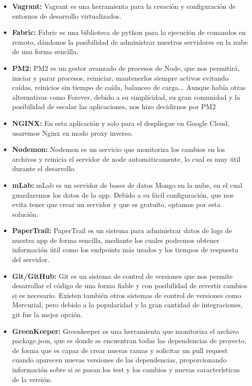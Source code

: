 \begin{itemize}
  \item \textbf{Vagrant:} Vagrant es una herramienta para la creación y configuración de entornos de desarrollo virtualizados.
  
  \item \textbf{Fabric: } Fabric es una biblioteca de python para la ejecución de comandos en remoto, dándonos la posibilidad de administrar nuestros servidores en la nube de una forma sencilla.
  
  \item \textbf{PM2:} PM2 es un gestor avanzado de procesos de Node, que nos permitirá, iniciar y parar procesos, reiniciar, mantenerlos siempre activos evitando caídas, reinicios sin tiempo de caída, balanceo de carga... Aunque había otras alternativas como Forever, debido a su simplicidad, su gran comunidad y la posibilidad de escalar las aplicaciones, nos hizo decidirnos por PM2
  
  \item \textbf{NGINX:} En esta aplicación y solo para el despliegue en Google Cloud, usaremos Nginx en modo \gls{proxy inverso}.
  
  \item \textbf{Nodemon:} Nodemon es un servicio que monitoriza los cambios en los archivos y reinicia el servidor de node automáticamente, lo cual es muy útil durante el desarrollo.
  
  \item \textbf{mLab:} mLab es un servidor de bases de datos Mongo en la nube, en el cual guardaremos los datos de la app. Debido a su fácil configuración, que nos evita tener que crear un servidor y que es gratuito, optamos por esta solución.
  
  \item \textbf{PaperTrail:} PaperTrail es un sistema para administrar datos de logs de nuestra app de forma sencilla, mediante los cuales podremos obtener información útil como los endpoints más usados y los tiempos de respuesta del servidor.
  
  \item \textbf{Git/GitHub:} Git es un sistema de control de versiones que nos permite desarrollar el código de una forma fiable y con posibilidad de revertir cambios si es necesario. Existen también otros sistemas de control de versiones como Mercurial, pero debido a la popularidad y la gran cantidad de integraciones, \gls{git} fue la mejor opción.
  
  \item \textbf{GreenKeeper:} Greenkeeper es una herramienta que monitoriza el archivo package.json, que es donde se encuentran todas las dependencias de proyecto, de forma que es capaz de crear nuevas ramas y solicitar un pull request cuando aparecen nuevas versiones de las dependencias, proporcionando información sobre si se pasan los test y los cambios y nuevas características de la versión.
  

\end{itemize}

